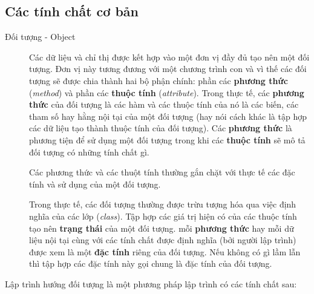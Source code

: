 \documentclass[10pt, a4paper]{article}
\begin{document}
\subsection{Các tính chất cơ bản}

\begin{description}
\item[Đối tượng - Object] Các dữ liệu và chỉ thị được kết hợp vào một đơn vị đầy đủ tạo nên một đối tượng. Đơn vị này tương đương với một chương trình con và vì thế các đối tượng sẽ được chia thành hai bộ phận chính: phần các \textbf{phương thức} (\emph{method}) và phần các \textbf{thuộc tính} (\emph{attribute}). Trong thực tế, các \textbf{phương thức} của đối tượng là các hàm và các thuộc tính của nó là các biến, các tham số hay hằng nội tại của một đối tượng (hay nói cách khác là tập hợp các dữ liệu tạo thành thuộc tính của đối tượng). Các \textbf{phương thức} là phương tiện để sử dụng một đối tượng trong khi các \textbf{thuộc tính} sẽ mô tả đối tượng có những tính chất gì.

Các phương thức và các thuột tính thường gắn chặt với thực tế các đặc tính và sử dụng của một đối tượng.

Trong thực tế, các đối tượng thường được trừu tượng hóa qua việc định nghĩa của các lớp (\emph{class}). Tập hợp các giá trị hiện có của các thuộc tính tạo nên \textbf{trạng thái} của một đối tượng.
mỗi {\bf phương thức} hay mỗi dữ liệu nội tại cùng với các tính chất được định nghĩa (bởi người lập trình) được xem là một {\bf đặc tính} riêng của đối tượng. Nếu không có gì lầm lẫn thì tập hợp các đặc tính này gọi chung là đặc tính của đối tượng.
\end{description}

Lập trình hướng đối tượng là một phương pháp lập trình có các tính chất sau:
\end{document}
